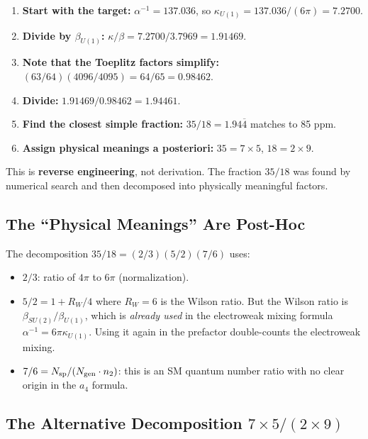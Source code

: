 \documentclass[12pt,a4paper]{article}
\theoremstyle{definition}
\begin{document}
\begin{enumerate}
\item \textbf{Start with the target:} $\alpha^{-1} = 137.036$, so
  $\kappa_{U(1)} = 137.036/(6\pi) = 7.2700$.

\item \textbf{Divide by $\beta_{U(1)}$:}
  $\kappa/\beta = 7.2700/3.7969 = 1.91469$.

\item \textbf{Note that the Toeplitz factors simplify:}
  $(63/64)(4096/4095) = 64/65 = 0.98462$.

\item \textbf{Divide:} $1.91469 / 0.98462 = 1.94461$.

\item \textbf{Find the closest simple fraction:} $35/18 = 1.94\overline{4}$
  matches to 85 ppm.

\item \textbf{Assign physical meanings a posteriori:}
  $35 = 7 \times 5$, $18 = 2 \times 9$.
\end{enumerate}

This is \textbf{reverse engineering}, not derivation.  The fraction
$35/18$ was found by numerical search and then decomposed into
physically meaningful factors.

\subsection{The ``Physical Meanings'' Are Post-Hoc}

The decomposition $35/18 = (2/3)(5/2)(7/6)$ uses:
\begin{itemize}
\item $2/3$: ratio of $4\pi$ to $6\pi$ (normalization).
\item $5/2 = 1 + R_W/4$ where $R_W = 6$ is the Wilson ratio.
  But the Wilson ratio is $\beta_{SU(2)}/\beta_{U(1)}$, which is
  \emph{already used} in the electroweak mixing formula
  $\alpha^{-1} = 6\pi\kappa_{U(1)}$.  Using it again in the
  prefactor double-counts the electroweak mixing.
\item $7/6 = N_{\rm sp}/(N_{\rm gen} \cdot n_2)$: this is an SM
  quantum number ratio with no clear origin in the $a_4$ formula.
\end{itemize}

\subsection{The Alternative Decomposition $7 \times 5/(2 \times 9)$}
\end{document}
